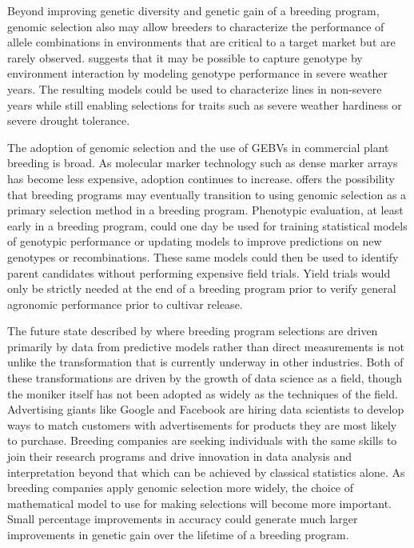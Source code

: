 Beyond improving genetic diversity and genetic gain of a breeding program, 
genomic selection also may allow breeders to characterize the performance of 
allele combinations in environments that are critical to a target market but
are rarely observed. \citet{heffner2009} suggests that it may be possible to
capture genotype by environment interaction by modeling genotype performance
in severe weather years. The resulting models could be used to characterize 
lines in non-severe years while still enabling selections for traits such as
severe weather hardiness or severe drought tolerance.

The adoption of genomic selection and the use of GEBVs in commercial plant
breeding is broad. As molecular marker technology such as dense marker 
arrays has become less expensive, adoption continues to increase. 
\citet{heffner2009} offers the possibility that breeding programs may 
eventually transition to using genomic selection as a primary selection method
in a breeding program. Phenotypic evaluation, at least early in a breeding 
program, could one day be used for training statistical models of genotypic 
performance or updating models to improve predictions on new genotypes 
or recombinations. These same models could then be used to identify 
parent candidates without performing expensive field trials.
Yield trials would only be strictly needed at the end of a breeding program
prior to verify general agronomic performance prior to cultivar release.

The future state described by \citet{heffner2009} where breeding program
selections are driven primarily by data from predictive models rather than
direct measurements is not unlike the transformation that is currently
underway in other industries. Both of these transformations are driven by the 
growth of data science as a field, though the moniker itself has not
been adopted as widely as the techniques of the field.
Advertising giants like Google and Facebook are hiring data scientists to develop
ways to match customers with advertisements for products they are 
most likely to purchase. Breeding companies are seeking individuals with the same skills to
join their research programs and drive innovation in data analysis and
interpretation beyond that which can be achieved by classical statistics
alone. As breeding companies apply genomic selection more widely, the choice of 
mathematical model to use for making selections will become more important. 
Small percentage improvements in accuracy could generate much larger
improvements in genetic gain over the lifetime of a breeding program.



